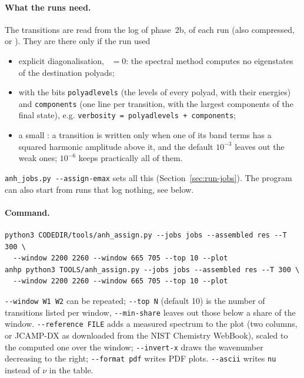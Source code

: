 \paragraph{What the runs need.} The transitions are read from the log of
phase~2b,  of each run (also compressed,
 or ). They are there only if the run used
\begin{itemize}
\item explicit diagonalisation, ~$=0$: the spectral method
  computes no eigenstates of the destination polyads;
\item {} with the bits \texttt{polyadlevels} (the levels of
  every polyad, with their energies) and \texttt{components} (one line per
  transition, with the largest components of the final state), e.g.
  \texttt{verbosity = polyadlevels + components};
\item a small : a transition is written only when one of
  its band terms has a squared harmonic amplitude above it, and the
  default $10^{-3}$ leaves out the weak ones; $10^{-6}$ keeps practically
  all of them.
\end{itemize}
\texttt{anh\_jobs.py -{}-assign-emax} sets all this
(Section~\ref{sec:run-jobs}). The program can also start from runs that
log nothing, see below.

\paragraph{Command.}
\begin{lstlisting}
python3 CODEDIR/tools/anh_assign.py --jobs jobs --assembled res --T 300 \
  --window 2200 2260 --window 665 705 --top 10 --plot
anhp python3 TOOLS/anh_assign.py --jobs jobs --assembled res --T 300 \
  --window 2200 2260 --window 665 705 --top 10 --plot
\end{lstlisting}
\texttt{-{}-window W1 W2} can be repeated; \texttt{-{}-top N} (default 10)
is the number of transitions listed per window, \texttt{-{}-min-share}
leaves out those below a share of the window. \texttt{-{}-reference FILE}
adds a measured spectrum to the plot (two columns, or JCAMP-DX as
downloaded from the NIST Chemistry WebBook), scaled to the computed one
over the window; \texttt{-{}-invert-x} draws the wavenumber decreasing to
the right; \texttt{-{}-format pdf} writes PDF plots. \texttt{-{}-ascii}
writes \texttt{nu} instead of $\nu$ in the table.

